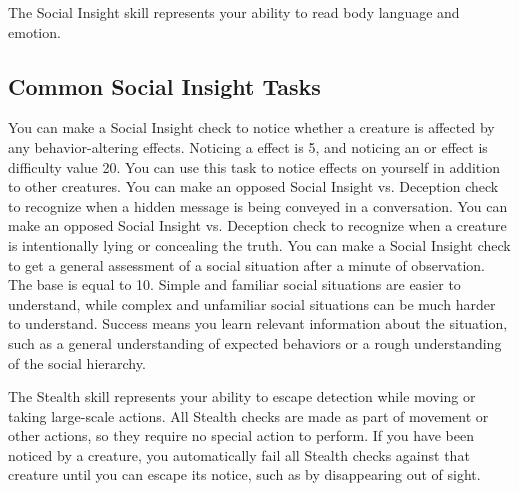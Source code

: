 \newpage
{}
        The Social Insight skill represents your ability to read body language and emotion.

    \subsection{Common Social Insight Tasks}
         You can make a Social Insight check to notice whether a creature is affected by any behavior-altering effects.
        Noticing a  effect is  5, and noticing an  or  effect is difficulty value 20.
        You can use this task to notice effects on yourself in addition to other creatures.
         You can make an opposed Social Insight vs. Deception check to recognize when a hidden message is being conveyed in a conversation.
         You can make an opposed Social Insight vs. Deception check to recognize when a creature is intentionally lying or concealing the truth.
        You can make a Social Insight check to get a general assessment of a social situation after a minute of observation.
        The base  is equal to 10.
        Simple and familiar social situations are easier to understand, while complex and unfamiliar social situations can be much harder to understand.
        Success means you learn relevant information about the situation, such as a general understanding of expected behaviors or a rough understanding of the social hierarchy.

\newpage
{}
        The Stealth skill represents your ability to escape detection while moving or taking large-scale actions.
        All Stealth checks are made as part of movement or other actions, so they require no special action to perform.
        If you have been noticed by a creature, you automatically fail all Stealth checks against that creature until you can escape its notice, such as by disappearing out of sight.

